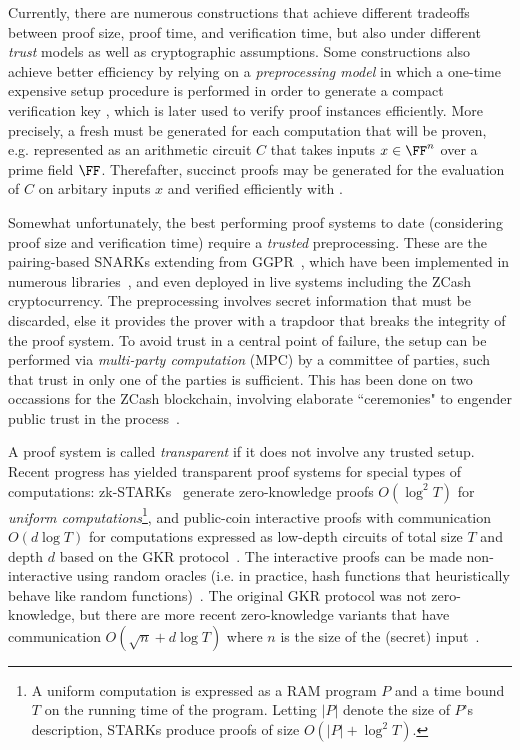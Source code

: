 Currently, there are numerous constructions that achieve different tradeoffs between proof size, proof time, and verification time, but also under different \emph{trust} models as well as cryptographic assumptions. %
Some constructions also achieve better efficiency by relying on a \emph{preprocessing model} in which a one-time expensive setup procedure is performed in order to generate a compact verification key , which is later used to verify proof instances efficiently. More precisely, a fresh  must be generated for each computation that will be proven, e.g. represented as an arithmetic circuit $C$ that takes inputs $x \in \FF^n$ over a prime field $\FF$. Therefafter, succinct proofs may be generated for the evaluation of $C$ on arbitary inputs $x$ and verified efficiently with . 

Somewhat unfortunately, the best performing proof systems to date (considering proof size and verification time) require a \emph{trusted} preprocessing. These are the pairing-based SNARKs extending from GGPR~\cite{EC:GGPR13,ES:SBVBPW13,SP:PHGR13,TCC:BCIOP13,C:BCGTV13,USENIX:BCTV14,EC:Groth16}, which have been implemented in numerous libraries~\cite{C:BCGTV13,bellman}, and even deployed in live systems including the ZCash~\cite{Zcash} cryptocurrency. The preprocessing involves secret information that must be discarded, else it provides the prover with a trapdoor that breaks the integrity of the proof system. To avoid trust in a central point of failure, the setup can be performed via \emph{multi-party computation} (MPC) by a committee of parties, such that trust in only one of the parties is sufficient. This has been done on two occassions for the ZCash blockchain, involving elaborate ``ceremonies" to engender public trust in the process~\cite{ZcashCeremony}. 

A proof system is called \emph{transparent} if it does not involve any trusted setup. Recent progress has yielded transparent proof systems for special types of computations: zk-STARKs~\cite{ICALP:BBHR18} generate zero-knowledge proofs $O(\log^2 T)$ for \emph{uniform computations}\footnote{A uniform computation is expressed as a RAM program $P$ and a time bound $T$ on the running time of the program. Letting $|P|$ denote the size of $P$'s description, STARKs produce proofs of size $O(|P| + \log^2 T)$.}, and public-coin interactive proofs with communication $O(d \log T)$ for computations expressed as low-depth circuits of total size $T$ and depth $d$ based on the GKR protocol~\cite{STOC:GolKalRot08}. The interactive proofs can be made non-interactive using random oracles (i.e. in practice, hash functions that heuristically behave like random functions)~\cite{C:FiaSha86,STOC:CCHLRRW19}. The original GKR protocol was not zero-knowledge, but there are more recent zero-knowledge variants that have communication $O( \sqrt{n} + d \log T)$ where $n$ is the size of the (secret) input~\cite{SP:WTSTW18,EPRINT:ZGKPP17b}. 


